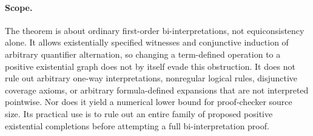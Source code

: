 \paragraph{Scope.}
The theorem is about ordinary first-order bi-interpretations, not
equiconsistency alone.  It allows existentially specified witnesses and
conjunctive induction of arbitrary quantifier alternation, so changing
a term-defined operation to a positive existential graph does not by
itself evade this obstruction.
It does not rule out arbitrary one-way interpretations, nonregular
logical rules, disjunctive coverage axioms, or arbitrary formula-defined
expansions that are not interpreted pointwise.  Nor does it yield a
numerical lower bound for proof-checker source size.  Its practical use
is to rule out an entire family of proposed positive existential
completions before attempting a full bi-interpretation proof.
